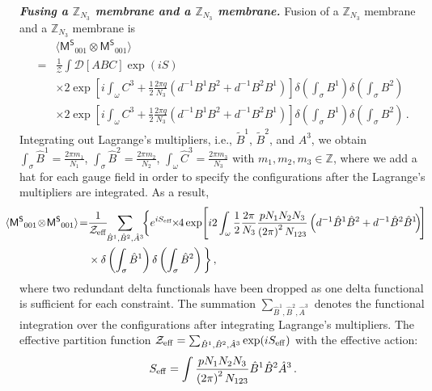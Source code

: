 \documentclass[11pt,nofootinbib,preprint]{revtex4-1}
\def\Z{\mathbb{Z}}
\begin{document}
\textbf{\textit{Fusing a $\mathbb{Z} _{N_3}$ membrane and a $\mathbb{Z} _{N_3}$ membrane.}}
Fusion of a $\mathbb{Z} _{N_3}$ membrane and a $\mathbb{Z} _{N_3}$ membrane is
\begin{align}
	&\langle \mathsf{M^S}_{001}\otimes \mathsf{M^S}_{001} \rangle  \nonumber\\
	=& \frac{1}{\mathcal{Z}}\!\!\int\!\! \mathcal{D} \!\left[ ABC \right]\!   \exp \left( iS \right)\nonumber
	\\
	&\times 2\exp \left[ i\int_{\omega}{C^3+\frac{1}{2}\frac{2\pi q}{N_3}\left( d^{-1}B^1B^2+d^{-1}B^2B^1 \right)} \right] \delta \left( \int_{\sigma}{B^1} \right) \delta \left( \int_{\sigma}{B^2} \right) \nonumber
	\\
	&\times 2\exp \left[ i\!\int_{\omega}{C^3+\frac{1}{2}\frac{2\pi q}{N_3}\left( d^{-1}B^1B^2+d^{-1}B^2B^1 \right)} \right] \!\delta \left( \int_{\sigma}{B^1} \right)\! \delta \left( \int_{\sigma}{B^2} \right) \,.
\end{align}
Integrating out Lagrange's multipliers, i.e., $\tilde{B}^1$, $\tilde{B}^2$, and $A^3$, we obtain $\int_{\sigma}{\hat{B}^1}=\frac{2\pi m_1}{N_1}$, $\int_{\sigma}{\hat{B}^2}=\frac{2\pi m_2}{N_2}$, $\int_{\omega}{\hat{C}^3}=\frac{2\pi m_3}{N_3}$ with $m_1,m_2,m_3\in\Z$, where we add a hat for each gauge field in order to specify the configurations after the Lagrange's multipliers are integrated. As a result, 
\begin{align}
\!\!\!\!\!\!	\!\!\langle \mathsf{M^S}_{001}\!\otimes \!\mathsf{M^S}_{001} \rangle \!=&\frac{1}{\mathcal{Z}_{\rm eff}}   \!\!\sum_{\hat{B}^1,\hat{B}^2,\hat{A}^3}\!\! \bigg\{e^{iS_{\rm eff}}  \!\!
	\times \!\!4\exp\! \left[ i2\int_{\omega}{\frac{1}{2}\frac{2\pi}{N_3}\frac{pN_1N_2N_3}{\left( 2\pi \right) ^2N_{123}}\left( d^{-1}\hat{B}^1\hat{B}^2+d^{-1}\hat{B}^2\hat{B}^1 \!\right)} \!\right] \nonumber
	\\
	&\times \delta \left( \int_{\sigma}{\hat{B}^1} \right) \delta \left( \int_{\sigma}{\hat{B}^2} \right)     \bigg\}\,,
	\label{eq_illustrate_nonAbelianfusion}
\end{align}
where two redundant delta functionals have been dropped as one delta functional  is sufficient for each constraint. The summation $\sum_{\hat{B}^1,\hat{B}^2,\hat{A}^3}$ denotes the functional integration over  the configurations after integrating Lagrange's multipliers. The effective partition function $\mathcal{Z}_{\rm eff}=\sum_{\hat{B}^1,\hat{B}^2,\hat{A}^3}\exp(iS_{\rm eff})$ with the effective action: 
\begin{align}
S_{\rm eff}= \int{\frac{pN_1N_2N_3}{\left( 2\pi \right) ^2N_{123}}\hat{B}^1\hat{B}^2\hat{A}^3}\,.
\end{align}
\end{document}

